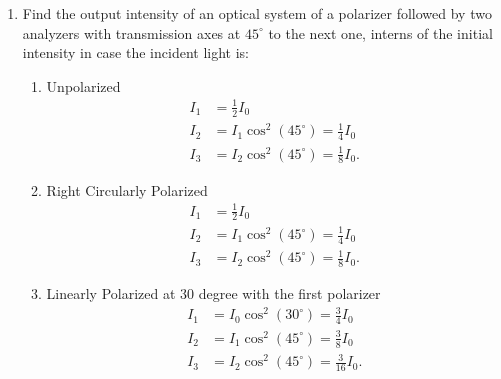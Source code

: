 \documentclass{zc-ust-hw}
\begin{document}
\maketitle

\begin{enumerate}
  \item Find the output intensity of an optical system of a polarizer followed
    by two analyzers with  transmission axes at $45^\circ$ to the next one,
    interns of the initial intensity in case the incident light is:
    \begin{enumerate}
      \item Unpolarized
        \begin{align}
          I_1 &= \frac{1}{2} I_0 \\
          I_2 &= I_1 \cos^2(45^\circ) = \frac{1}{4} I_0 \\
          I_3 &= I_2 \cos^2(45^\circ) = \frac{1}{8} I_0
        .\end{align}
      \item Right Circularly Polarized
        \begin{align}
          I_1 &= \frac{1}{2} I_0 \\
          I_2 &= I_1 \cos^2(45^\circ) = \frac{1}{4} I_0 \\
          I_3 &= I_2 \cos^2(45^\circ) = \frac{1}{8} I_0
        .\end{align}
      \item Linearly Polarized at 30 degree with the first polarizer
        \begin{align}
          I_1 &= I_0 \cos^2(30^\circ) = \frac{3}{4} I_0 \\
          I_2 &= I_1 \cos^2(45^\circ) = \frac{3}{8} I_0 \\
          I_3 &= I_2 \cos^2(45^\circ) = \frac{3}{16} I_0
        .\end{align}
    \end{enumerate}


\end{enumerate}
\end{document}
